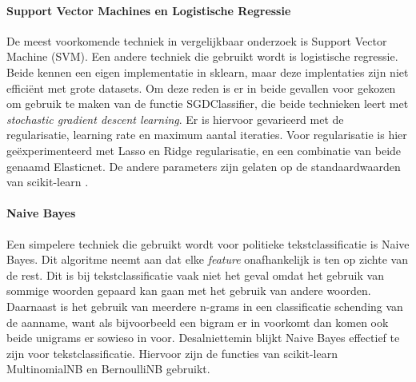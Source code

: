 \paragraph{Support Vector Machines en Logistische Regressie}
De meest voorkomende techniek in vergelijkbaar onderzoek is Support Vector Machine (SVM). Een andere techniek die gebruikt wordt is logistische regressie. Beide kennen een eigen implementatie in sklearn, maar deze implentaties zijn niet efficiënt met grote datasets. Om deze reden is er in beide gevallen voor gekozen om gebruik te maken van de functie SGDClassifier, die beide technieken leert met \textit{stochastic gradient descent learning}. Er is hiervoor gevarieerd met de regularisatie, learning rate en maximum aantal iteraties. Voor regularisatie is hier geëxperimenteerd met Lasso en Ridge regularisatie, en een combinatie van beide genaamd Elasticnet. De andere parameters zijn gelaten op de standaardwaarden van scikit-learn \cite{scikit-learn}.\par

\paragraph{Naive Bayes}
Een simpelere techniek die gebruikt wordt voor politieke tekstclassificatie is Naive Bayes. Dit algoritme neemt aan dat elke \textit{feature} onafhankelijk is ten op zichte van de rest. Dit is bij tekstclassificatie vaak niet het geval omdat het gebruik van sommige woorden gepaard kan gaan met het gebruik van andere woorden. Daarnaast is het gebruik van meerdere n-grams in een classificatie schending van de aanname, want als bijvoorbeeld een bigram er in voorkomt dan komen ook beide unigrams er sowieso in voor. Desalniettemin blijkt Naive Bayes effectief te zijn voor tekstclassificatie\cite{scikit-learn,bhand}. Hiervoor zijn de functies van scikit-learn MultinomialNB en BernoulliNB gebruikt.\cite{scikit-learn,bhand}\par

